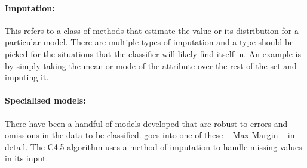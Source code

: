\documentclass[10pt]{article}
\begin{document}
  \paragraph{Imputation: } This refers to a class of methods that estimate the value or its distribution for a particular
    model. There are multiple types of imputation and a type should be picked for the situations that the classifier
    will likely find itself in. An example is by simply taking the mean or mode of the attribute over the rest of the set
    and imputing it.

  \paragraph{Specialised models: } There have been a handful of models developed that are robust to errors and omissions
    in the data to be classified.  \cite{citeulike:4732435} goes into one of these -- Max-Margin -- in detail. The C4.5 
    algorithm uses a method of imputation to handle missing values in its input.


 
\end{document}
